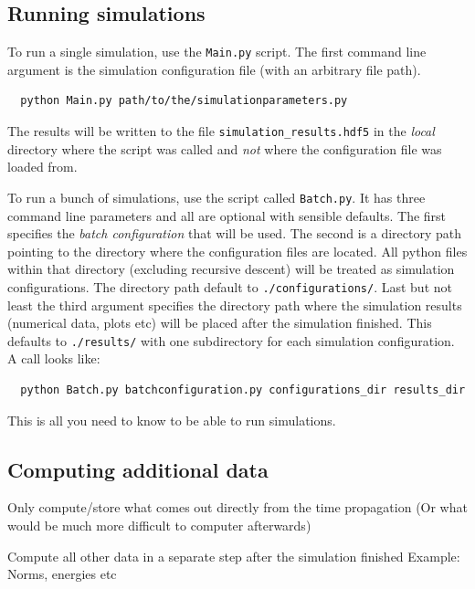 \documentclass[a4paper,10pt]{report}
\begin{document}
\subsection{Running simulations}

To run a single simulation, use the \texttt{Main.py} script. The first command
line argument is the simulation configuration file (with an arbitrary file path).

\begin{verbatim}
  python Main.py path/to/the/simulationparameters.py
\end{verbatim}

The results will be written to the file \texttt{simulation\_results.hdf5}
in the \emph{local} directory where the script was called and \emph{not}
where the configuration file was loaded from.

To run a bunch of simulations, use the script called \texttt{Batch.py}. It
has three command line parameters and all are optional with sensible defaults.
The first specifies the \emph{batch configuration} that will be used. The second
is a directory path pointing to the directory where the configuration files
are located. All python files within that directory (excluding recursive descent)
will be treated as simulation configurations. The directory path default to
\texttt{./configurations/}. Last but not least the third argument specifies the
directory path where the simulation results (numerical data, plots etc) will be
placed after the simulation finished. This defaults to \texttt{./results/}
with one subdirectory for each simulation configuration. A call looks like:

\begin{verbatim}
  python Batch.py batchconfiguration.py configurations_dir results_dir
\end{verbatim}

This is all you need to know to be able to run simulations.



\subsection{Computing additional data}

Only compute/store what comes out directly from the time propagation
(Or what would be much more difficult to computer afterwards)

Compute all other data in a separate step after the simulation finished
Example: Norms, energies etc
\end{document}

